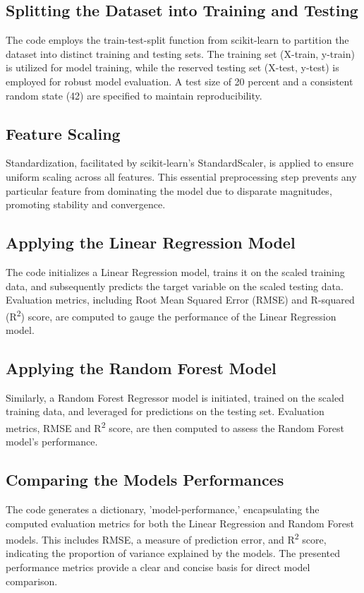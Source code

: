 \documentclass[conference]{IEEEtran}
\begin{document}
\subsection{Splitting the Dataset into Training and Testing}
The code employs the train-test-split function from scikit-learn to partition the dataset into distinct training and testing sets. The training set (X-train, y-train) is utilized for model training, while the reserved testing set (X-test, y-test) is employed for robust model evaluation. A test size of 20 percent and a consistent random state (42) are specified to maintain reproducibility.

\subsection{Feature Scaling}
Standardization, facilitated by scikit-learn's StandardScaler, is applied to ensure uniform scaling across all features. This essential preprocessing step prevents any particular feature from dominating the model due to disparate magnitudes, promoting stability and convergence.

\subsection{Applying the Linear Regression Model}
The code initializes a Linear Regression model, trains it on the scaled training data, and subsequently predicts the target variable on the scaled testing data. Evaluation metrics, including Root Mean Squared Error (RMSE) and R-squared (R\textsuperscript{2}) score, are computed to gauge the performance of the Linear Regression model.

\subsection{Applying the Random Forest Model}
Similarly, a Random Forest Regressor model is initiated, trained on the scaled training data, and leveraged for predictions on the testing set. Evaluation metrics, RMSE and R\textsuperscript{2} score, are then computed to assess the Random Forest model's performance.

\subsection{Comparing the Models Performances}
The code generates a dictionary, 'model-performance,' encapsulating the computed evaluation metrics for both the Linear Regression and Random Forest models. This includes RMSE, a measure of prediction error, and R\textsuperscript{2} score, indicating the proportion of variance explained by the models. The presented performance metrics provide a clear and concise basis for direct model comparison.
\end{document}
